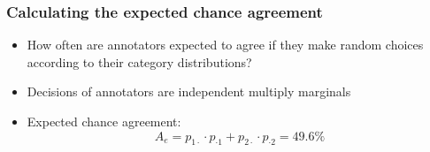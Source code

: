 \documentclass[t]{beamer} %
\begin{document}
\begin{frame}
  \frametitle{Calculating the expected chance agreement}

  \begin{itemize}
  \item<1-> How often are annotators expected to agree if they make random choices
    according to their category distributions?
  \item<2-> Decisions of annotators are independent \so multiply marginals
  \end{itemize}


  \gap[1.5]
  \begin{itemize}
  \item<4->[\So] Expected chance agreement: 
    \[
    A_e = p_{1\cdot}\cdot p_{\cdot 1} + p_{2\cdot}\cdot p_{\cdot 2} = 49.6\%
    \]
  \end{itemize}
\end{frame}
\end{document}
